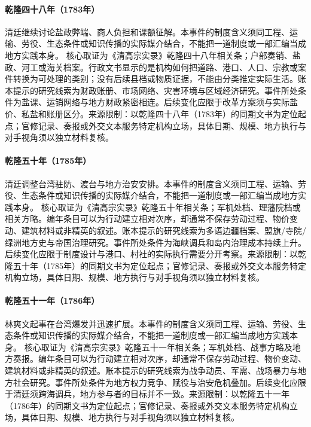 \hypertarget{civic:EQ-1783-SALT-MONOPOLY-REVIEW}{}\paragraph{乾隆四十八年（1783年）}清廷继续讨论盐政弊端、商人负担和课额征解。本事件的制度含义须同工程、运输、劳役、生态条件或知识传播的实际媒介结合，不能把一道制度或一部汇编当成地方实践本身。 核心取证为《清高宗实录》乾隆四十八年相关条；户部奏销、盐政、河工或海关档案。行政文书显示的是机构如何把道路、港口、人口、宗教或案件转换为可处理的类别；没有后续县档或物质证据，不能由分类推定实际生活。账本提示的研究线索为财政账册、市场网络、灾害环境与区域经济研究。事件所处条件为盐课、运销网络与地方财政紧密相连。后续变化应限于改革方案须与实际盐价、私盐和账册区分。来源限制：以乾隆四十八年（1783年）的同期文书为定位起点；官修记录、奏报或外交文本服务特定机构立场，具体日期、规模、地方执行与对手视角须以独立材料复核。
\hypertarget{civic:EQ-1785-TAIWAN-GARRISON}{}\paragraph{乾隆五十年（1785年）}清廷调整台湾驻防、渡台与地方治安安排。本事件的制度含义须同工程、运输、劳役、生态条件或知识传播的实际媒介结合，不能把一道制度或一部汇编当成地方实践本身。 核心取证为《清高宗实录》乾隆五十年相关条；军机处档、理藩院档或相关方略。编年条目可以为行动建立相对次序，却通常不保存劳动过程、物价变动、建筑材料或非精英的叙述。账本提示的研究线索为多语边疆档案、盟旗/寺院/绿洲地方史与帝国治理研究。事件所处条件为海峡调兵和岛内治理成本持续上升。后续变化应限于制度设计与港口、村社的实际执行需要分开考察。来源限制：以乾隆五十年（1785年）的同期文书为定位起点；官修记录、奏报或外交文本服务特定机构立场，具体日期、规模、地方执行与对手视角须以独立材料复核。
\hypertarget{civic:EQ-1786-LIN-SHUANGWEN-UPRISING}{}\paragraph{乾隆五十一年（1786年）}林爽文起事在台湾爆发并迅速扩展。本事件的制度含义须同工程、运输、劳役、生态条件或知识传播的实际媒介结合，不能把一道制度或一部汇编当成地方实践本身。 核心取证为《清高宗实录》乾隆五十一年相关条；军机处档、战事方略及地方奏报。编年条目可以为行动建立相对次序，却通常不保存劳动过程、物价变动、建筑材料或非精英的叙述。账本提示的研究线索为战争动员、军需、战场暴力与地方社会研究。事件所处条件为地方权力竞争、赋役与治安危机叠加。后续变化应限于清廷须跨海调兵，地方参与者的目标并不一致。来源限制：以乾隆五十一年（1786年）的同期文书为定位起点；官修记录、奏报或外交文本服务特定机构立场，具体日期、规模、地方执行与对手视角须以独立材料复核。
